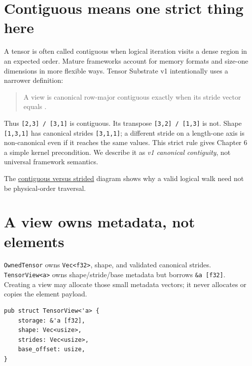 \section{Contiguous means one strict thing
here}\label{contiguous-means-one-strict-thing-here}

A tensor is often called contiguous when logical iteration visits a
dense region in an expected order. Mature frameworks account for memory
formats and size-one dimensions in more flexible ways. Tensor Substrate
v1 intentionally uses a narrower definition:

\begin{quote}
A view is canonical row-major contiguous exactly when its stride vector
equals \texttt{}.
\end{quote}

Thus \texttt{{[}2,3{]}\ /\ {[}3,1{]}} is contiguous. Its transpose
\texttt{{[}3,2{]}\ /\ {[}1,3{]}} is not. Shape \texttt{{[}1,3,1{]}} has
canonical strides \texttt{{[}3,1,1{]}}; a different stride on a
length-one axis is non-canonical even if it reaches the same values.
This strict rule gives Chapter 6 a simple kernel precondition. We
describe it as \emph{v1 canonical contiguity}, not universal framework
semantics.

The
\href{https://github.com/hermonai/inside-the-llm-engine/blob/astra-visual-rewrite/diagrams/tensor/contiguous-vs-strided.txt}{contiguous
versus strided} diagram shows why a valid logical walk need not be
physical-order traversal.

\section{A view owns metadata, not
elements}\label{a-view-owns-metadata-not-elements}

\texttt{OwnedTensor} owns \texttt{Vec\textless{}f32\textgreater{}},
shape, and validated canonical strides.
\texttt{TensorView\textless{}\textquotesingle{}a\textgreater{}} owns
shape/stride/base metadata but borrows
\texttt{\&\textquotesingle{}a\ {[}f32{]}}. Creating a view may allocate
those small metadata vectors; it never allocates or copies the element
payload.

\begin{verbatim}
pub struct TensorView<'a> {
    storage: &'a [f32],
    shape: Vec<usize>,
    strides: Vec<usize>,
    base_offset: usize,
}
\end{verbatim}

